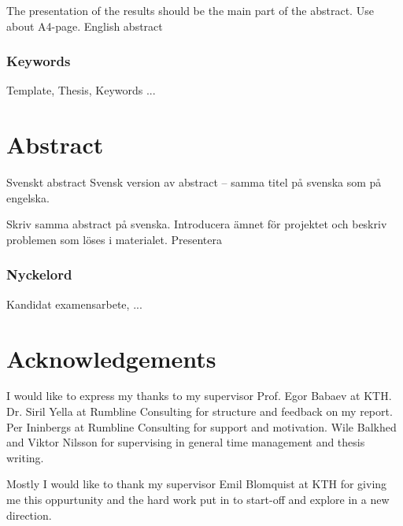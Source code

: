 The presentation of the results should be the main part of the abstract. Use about  A4-page.
English abstract




\subsection*{Keywords}
Template, Thesis, Keywords ...





\newpage
\thispagestyle{plain}
\chapter*{Abstract}
Svenskt abstract
Svensk version av abstract – samma titel på svenska som på engelska.

Skriv samma abstract på svenska. Introducera ämnet för projektet och beskriv problemen som löses i materialet. Presentera 

\subsection*{Nyckelord}
Kandidat examensarbete, ...


\newpage
\thispagestyle{plain}
\chapter*{Acknowledgements}
I would like to express my thanks to my supervisor Prof. Egor Babaev at KTH. Dr. Siril Yella at Rumbline Consulting for structure and feedback on my report. Per Ininbergs at Rumbline Consulting for support and motivation. Wile Balkhed and Viktor Nilsson for supervising in general time management and thesis writing. 

Mostly I would like to thank my supervisor Emil Blomquist at KTH for giving me this oppurtunity and the hard work put in to start-off and explore in a new direction.

\newpage

\thispagestyle{plain}

\tableofcontents

\newpage
{}

